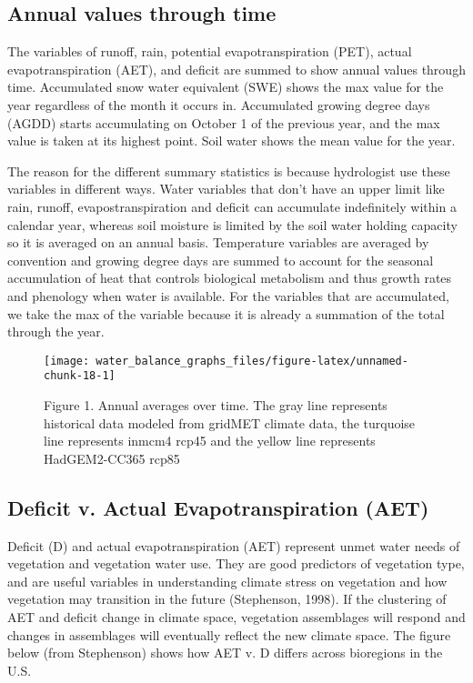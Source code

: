 \documentclass[
]{article}
\begin{document}
\hypertarget{annual-values-through-time}{%
\subsection{Annual values through
time}\label{annual-values-through-time}}

The variables of runoff, rain, potential evapotranspiration (PET),
actual evapotranspiration (AET), and deficit are summed to show annual
values through time. Accumulated snow water equivalent (SWE) shows the
max value for the year regardless of the month it occurs in. Accumulated
growing degree days (AGDD) starts accumulating on October 1 of the
previous year, and the max value is taken at its highest point. Soil
water shows the mean value for the year.

The reason for the different summary statistics is because hydrologist
use these variables in different ways. Water variables that don't have
an upper limit like rain, runoff, evapostranspiration and deficit can
accumulate indefinitely within a calendar year, whereas soil moisture is
limited by the soil water holding capacity so it is averaged on an
annual basis. Temperature variables are averaged by convention and
growing degree days are summed to account for the seasonal accumulation
of heat that controls biological metabolism and thus growth rates and
phenology when water is available. For the variables that are
accumulated, we take the max of the variable because it is already a
summation of the total through the year.

\begin{figure}

{\centering \texttt{[image: water\_balance\_graphs\_files/figure-latex/unnamed-chunk-18-1]} 

}

\caption{Figure 1. Annual averages over time. The gray line represents historical data modeled from gridMET climate data, the turquoise line represents inmcm4 rcp45 and the yellow line represents HadGEM2-CC365 rcp85}\label{fig:unnamed-chunk-18}
\end{figure}

\hypertarget{deficit-v.-actual-evapotranspiration-aet}{%
\subsection{Deficit v. Actual Evapotranspiration
(AET)}\label{deficit-v.-actual-evapotranspiration-aet}}

Deficit (D) and actual evapotranspiration (AET) represent unmet water
needs of vegetation and vegetation water use. They are good predictors
of vegetation type, and are useful variables in understanding climate
stress on vegetation and how vegetation may transition in the future
(Stephenson, 1998). If the clustering of AET and deficit change in
climate space, vegetation assemblages will respond and changes in
assemblages will eventually reflect the new climate space. The figure
below (from Stephenson) shows how AET v. D differs across bioregions in
the U.S.
\end{document}
